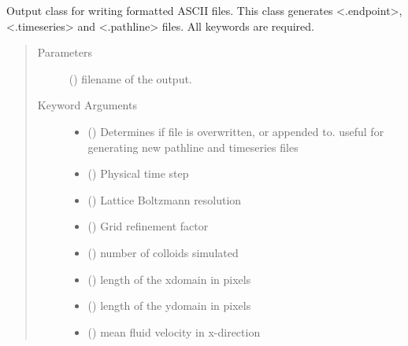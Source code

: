 \documentclass[letterpaper,10pt,english]{sphinxmanual}
\begin{document}
\begin{fulllineitems}
\label{\detokenize{index:lb_colloids.Colloids.Colloid_IO.Output}}
Output class for writing formatted ASCII files. This class generates
\textless{}.endpoint\textgreater{}, \textless{}.timeseries\textgreater{} and \textless{}.pathline\textgreater{} files. All keywords are required.
\begin{quote}\begin{description}
\item[{Parameters}] \leavevmode
{} () \textendash{} filename of the output.

\item[{Keyword Arguments}] \leavevmode\begin{itemize}
\item {} 
 () \textendash{} Determines if file is overwritten, or appended to.
useful for generating new pathline and timeseries files

\item {} 
 () \textendash{} Physical time step

\item {} 
 () \textendash{} Lattice Boltzmann resolution

\item {} 
 () \textendash{} Grid refinement factor

\item {} 
 () \textendash{} number of colloids simulated

\item {} 
 () \textendash{} length of the xdomain in pixels

\item {} 
 () \textendash{} length of the ydomain in pixels

\item {} 
 () \textendash{} mean fluid velocity in x-direction


\end{itemize}
\end{description}
\end{quote}
\end{fulllineitems}
\end{document}
